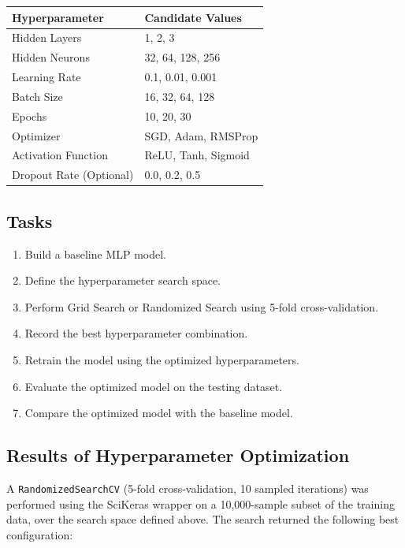 \documentclass[11pt]{article}
\begin{document}
\begin{center}
\begin{tabular}{|p{5cm}|p{7cm}|}
\hline
Hyperparameter & Candidate Values\\
\hline
Hidden Layers & 1, 2, 3\\
Hidden Neurons & 32, 64, 128, 256\\
Learning Rate & 0.1, 0.01, 0.001\\
Batch Size & 16, 32, 64, 128\\
Epochs & 10, 20, 30\\
Optimizer & SGD, Adam, RMSProp\\
Activation Function & ReLU, Tanh, Sigmoid\\
Dropout Rate (Optional) & 0.0, 0.2, 0.5\\
\hline
\end{tabular}
\end{center}

\subsection*{Tasks}

\begin{enumerate}
\item Build a baseline MLP model.
\item Define the hyperparameter search space.
\item Perform Grid Search or Randomized Search using 5-fold cross-validation.
\item Record the best hyperparameter combination.
\item Retrain the model using the optimized hyperparameters.
\item Evaluate the optimized model on the testing dataset.
\item Compare the optimized model with the baseline model.
\end{enumerate}

\subsection*{Results of Hyperparameter Optimization}

A \texttt{RandomizedSearchCV} (5-fold cross-validation, 10 sampled iterations) was performed using the SciKeras wrapper on a 10,000-sample subset of the training data, over the search space defined above. The search returned the following best configuration:
\end{document}
